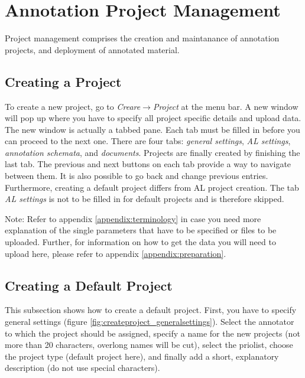 \documentclass[DIV12,english,11pt,halfparskip]{scrartcl}
\begin{document}
\section{Annotation Project Management}

Project management comprises the creation and maintanance of
annotation projects, and deployment of annotated material.

\subsection{Creating a Project}

To create a new project, go to \emph{Creare$\rightarrow$Project} at
the menu bar. A new window will pop up where you have to specify all
project specific details and upload data. The new window is actually a
tabbed pane.  Each tab must be filled in before you can proceed to the
next one.  There are four tabs: \textit{general settings}, \textit{AL
  settings}, \textit{annotation schemata}, and \textit{documents}.
Projects are finally created by finishing the last tab. The previous
and next buttons on each tab provide a way to navigate between them.
It is also possible to go back and change previous entries.
Furthermore, creating a default project differs from AL project
creation. The tab \textit{AL settings} is not to be filled in for
default projects and is therefore skipped.

Note: Refer to appendix \ref{appendix:terminology} in case you need
more explanation of the single parameters that have to be specified or
files to be uploaded. Further, for information on how to get the data
you will need to upload here, please refer to appendix
\ref{appendix:preparation}.


\subsection{Creating a Default Project}
This subsection shows how to create a default project. First, you have
to specify general settings (figure
\ref{fig:createproject_generalsettings}). Select the annotator to
which the project should be assigned, specify a name for the new
projects (not more than 20 characters, overlong names will be cut),
select the priolist, choose the project type (default project here),
and finally add a short, explanatory description (do not use special
characters).
\end{document}

